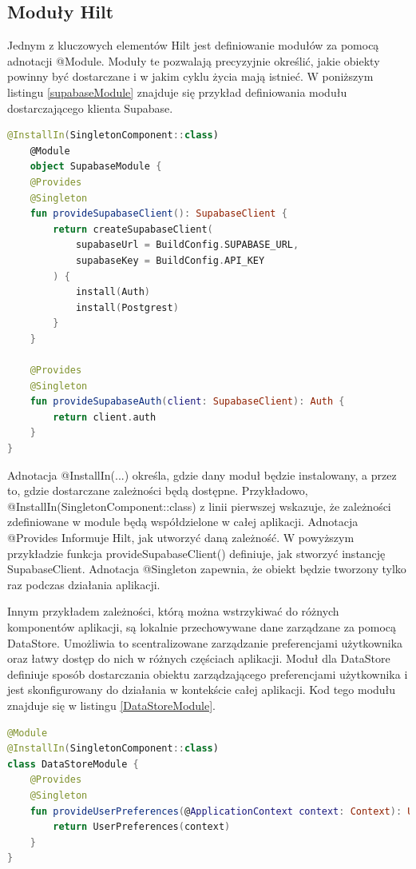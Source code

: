 \documentclass[12pt,twoside]{article}
\begin{document}
\subsection{Moduły Hilt}

Jednym z kluczowych elementów Hilt jest definiowanie modułów za pomocą adnotacji @Module. Moduły te pozwalają 
precyzyjnie określić, jakie obiekty powinny być dostarczane i w jakim cyklu życia mają istnieć. W poniższym listingu
\ref{supabaseModule} znajduje się przykład definiowania modułu dostarczającego klienta Supabase.
\begin{lstlisting}[language=Kotlin,caption=Przykład modułu klienta Supabase, label={supabaseModule}]
	@InstallIn(SingletonComponent::class)
	@Module
	object SupabaseModule {
    @Provides
    @Singleton
    fun provideSupabaseClient(): SupabaseClient {
        return createSupabaseClient(
            supabaseUrl = BuildConfig.SUPABASE_URL,
            supabaseKey = BuildConfig.API_KEY
        ) {
            install(Auth)
            install(Postgrest)
        }
    }

    @Provides
    @Singleton
    fun provideSupabaseAuth(client: SupabaseClient): Auth {
        return client.auth
    }
}
\end{lstlisting}
Adnotacja @InstallIn(...) określa, gdzie dany moduł będzie instalowany, a przez to, gdzie dostarczane zależności 
będą dostępne. Przykładowo, @InstallIn(SingletonComponent::class) z linii pierwszej wskazuje, że zależności 
zdefiniowane w module będą współdzielone w całej aplikacji. Adnotacja @Provides
Informuje Hilt, jak utworzyć daną zależność. W powyższym przykładzie funkcja provideSupabaseClient() definiuje, jak 
stworzyć instancję SupabaseClient. Adnotacja @Singleton zapewnia, że obiekt będzie tworzony tylko raz podczas działania 
aplikacji.

Innym przykładem zależności, którą można wstrzykiwać do różnych komponentów aplikacji, są lokalnie przechowywane 
dane zarządzane za pomocą DataStore. Umożliwia to scentralizowane zarządzanie preferencjami użytkownika oraz łatwy 
dostęp do nich w różnych częściach aplikacji. Moduł dla DataStore definiuje sposób dostarczania obiektu zarządzającego 
preferencjami użytkownika i jest skonfigurowany do działania w kontekście całej aplikacji. Kod tego modułu znajduje 
się w listingu \ref{DataStoreModule}.

\begin{lstlisting}[language=Kotlin,caption=Przykład modułu DataStore, label={DataStoreModule}]
@Module
@InstallIn(SingletonComponent::class)
class DataStoreModule {
    @Provides
    @Singleton
    fun provideUserPreferences(@ApplicationContext context: Context): UserPreferences {
        return UserPreferences(context)
    }
}
\end{lstlisting}
\end{document}

